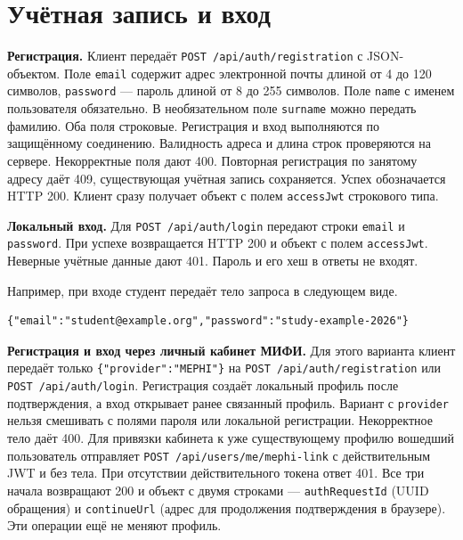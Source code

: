 \documentclass[12pt,a4paper]{article}
\begin{document}
\section{Учётная запись и вход}\label{ux443ux447ux451ux442ux43dux430ux44f-ux437ux430ux43fux438ux441ux44c-ux438-ux432ux445ux43eux434}

\hypertarget{учётная-запись-и-вход}{}

\textbf{Регистрация.} Клиент передаёт \texttt{POST /\allowbreak{}api/\allowbreak{}auth/\allowbreak{}registration} с JSON-объектом. Поле \texttt{email} содержит адрес электронной почты длиной от 4 до 120 символов, \texttt{password} --- пароль длиной от 8 до 255 символов. Поле \texttt{name} с именем пользователя обязательно. В необязательном поле \texttt{surname} можно передать фамилию. Оба поля строковые. Регистрация и вход выполняются по защищённому соединению. Валидность адреса и длина строк проверяются на сервере. Некорректные поля дают 400. Повторная регистрация по занятому адресу даёт 409, существующая учётная запись сохраняется. Успех обозначается HTTP 200. Клиент сразу получает объект с полем \texttt{accessJwt} строкового типа.

\textbf{Локальный вход.} Для \texttt{POST /\allowbreak{}api/\allowbreak{}auth/\allowbreak{}login} передают строки \texttt{email} и \texttt{password}. При успехе возвращается HTTP 200 и объект с полем \texttt{accessJwt}. Неверные учётные данные дают 401. Пароль и его хеш в ответы не входят.

Например, при входе студент передаёт тело запроса в следующем виде.

\begin{verbatim}
{"email":"student@example.org","password":"study-example-2026"}
\end{verbatim}

\textbf{Регистрация и вход через личный кабинет МИФИ.} Для этого варианта клиент передаёт только \texttt{\{"provider":"MEPHI"\}} на \texttt{POST /\allowbreak{}api/\allowbreak{}auth/\allowbreak{}registration} или \texttt{POST /\allowbreak{}api/\allowbreak{}auth/\allowbreak{}login}. Регистрация создаёт локальный профиль после подтверждения, а вход открывает ранее связанный профиль. Вариант с \texttt{provider} нельзя смешивать с полями пароля или локальной регистрации. Некорректное тело даёт 400. Для привязки кабинета к уже существующему профилю вошедший пользователь отправляет \texttt{POST /\allowbreak{}api/\allowbreak{}users/\allowbreak{}me/\allowbreak{}mephi-\allowbreak{}link} с действительным JWT и без тела. При отсутствии действительного токена ответ 401. Все три начала возвращают 200 и объект с двумя строками --- \texttt{auth\allowbreak{}Request\allowbreak{}Id} (UUID обращения) и \texttt{continue\allowbreak{}Url} (адрес для продолжения подтверждения в браузере). Эти операции ещё не меняют профиль.
\end{document}
